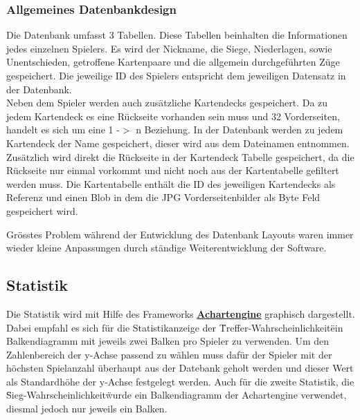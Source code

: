 \documentclass[11pt,a4paper]{article}
\begin{document}
\subsubsection{Allgemeines Datenbankdesign}
Die Datenbank umfasst 3 Tabellen. Diese Tabellen beinhalten die Informationen jedes einzelnen Spielers. Es wird der Nickname, die Siege, Niederlagen, sowie Unentschieden, getroffene Kartenpaare und die allgemein durchgeführten Züge gespeichert. Die jeweilige ID des Spielers entspricht dem jeweiligen Datensatz in der Datenbank.\\
Neben dem Spieler werden auch zusätzliche Kartendecks gespeichert. Da zu jedem Kartendeck es eine Rückseite vorhanden sein muss und 32 Vorderseiten, handelt es sich um eine 1 -$>$ n Beziehung. In der Datenbank werden zu jedem Kartendeck der Name gespeichert, dieser wird aus dem Dateinamen entnommen. Zusätzlich wird direkt die Rückseite in der Kartendeck Tabelle gespeichert, da die Rückseite nur einmal vorkommt und nicht noch aus der Kartentabelle gefiltert werden muss. Die Kartentabelle enthält die ID des jeweiligen Kartendecks als Referenz und einen Blob in dem die JPG Vorderseitenbilder als Byte Feld gespeichert wird.

Grösstes Problem während der Entwicklung des Datenbank Layouts waren immer wieder kleine Anpassungen durch ständige Weiterentwicklung der Software.

\subsection{Statistik}
Die Statistik wird mit Hilfe des Frameworks \textbf{\href{http://www.achartengine.org/}{Achartengine}} graphisch dargestellt. Dabei empfahl es sich für die Statistikanzeige der \"Treffer-Wahrscheinlichkeit\" ein Balkendiagramm mit jeweils zwei Balken pro Spieler zu verwenden. Um den Zahlenbereich der y-Achse passend zu wählen muss dafür der Spieler mit der höchsten Spielanzahl überhaupt aus der Datebank geholt werden und dieser Wert als Standardhöhe der y-Achse festgelegt werden.
Auch für die zweite Statistik, die \"Sieg-Wahrscheinlichkeit\" wurde ein Balkendiagramm der Achartengine verwendet, diesmal jedoch nur jeweils ein Balken. 
\end{document}
